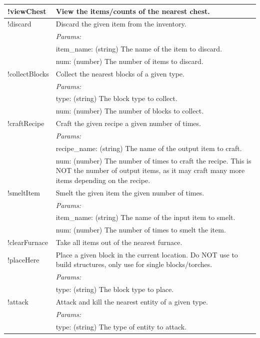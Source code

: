 \documentclass{article}
\begin{document}
\begin{table}[]
\begin{tabular}{|p{}|p{}|}
    \hline
    !viewChest & View the items/counts of the nearest chest. \\
    \hline
    !discard & Discard the given item from the inventory. \\
    & \textit{Params:} \\
    & item\_name: (string) The name of the item to discard. \\
    & num: (number) The number of items to discard. \\
    \hline
    !collectBlocks & Collect the nearest blocks of a given type. \\
    & \textit{Params:} \\
    & type: (string) The block type to collect. \\
    & num: (number) The number of blocks to collect. \\
    \hline
    !craftRecipe & Craft the given recipe a given number of times. \\
    & \textit{Params:} \\
    & recipe\_name: (string) The name of the output item to craft. \\
    & num: (number) The number of times to craft the recipe. This is NOT the number of output items, as it may craft many more items depending on the recipe. \\
    \hline
    !smeltItem & Smelt the given item the given number of times. \\
    & \textit{Params:} \\
    & item\_name: (string) The name of the input item to smelt. \\
    & num: (number) The number of times to smelt the item. \\
    \hline
    !clearFurnace & Take all items out of the nearest furnace. \\
    \hline
    !placeHere & Place a given block in the current location. Do NOT use to build structures, only use for single blocks/torches. \\
    & \textit{Params:} \\
    & type: (string) The block type to place. \\
    \hline
    !attack & Attack and kill the nearest entity of a given type. \\
    & \textit{Params:} \\
    & type: (string) The type of entity to attack. \\
    \hline
    \end{tabular}
    \label{tab:mindcraft_commands_2}
\end{table}
\end{document}
